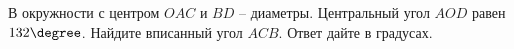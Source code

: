 \begin{ex}
	\begin{condition}
		В окружности с центром \( O AC \) и \( BD \) – диаметры. Центральный угол \( AOD \)  равен \( 132 \degree \). Найдите вписанный угол \( ACB \). Ответ дайте в градусах.
	\end{condition}
\end{ex}